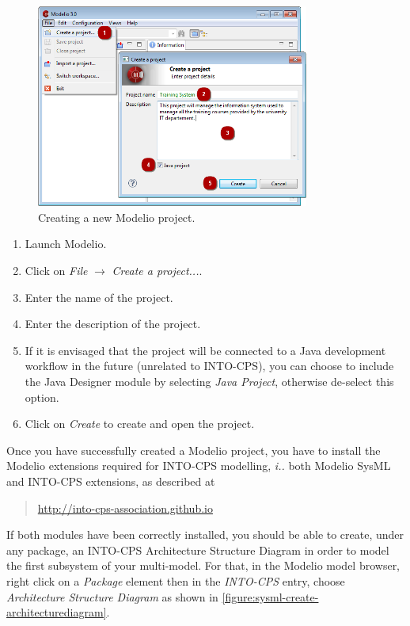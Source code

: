 %
\begin{figure}[hpt!]
\centering
\includegraphics[width=0.8\textwidth]{./figures/modelio-createnewproject.png}
\caption{Creating a new Modelio project.}
\label{figure:modelio-project-creation}
\end{figure}
%
%
%
\begin{enumerate}
\item Launch Modelio.
\item Click on \emph{File} $\rightarrow$ \emph{Create a project...}.
\item Enter the name of the project.
\item Enter the description of the project.
\item If it is envisaged that the project will be connected to a Java development workflow in the future (unrelated to INTO-CPS), you can choose to include the Java Designer module by selecting \emph{Java Project}, otherwise de-select this option.
\item Click on \emph{Create} to create and open the project.
\end{enumerate}
%
%
%
Once you have successfully created a Modelio project, you have to install the Modelio extensions required for INTO-CPS modelling, \emph{i.\@e.\@} both Modelio SysML and INTO-CPS extensions, as described at
%
%
%
\begin{quote}
\url{http://into-cps-association.github.io}
\end{quote}
%
%
%
If both modules have been correctly installed, you should be able to create, under any package, an INTO-CPS Architecture Structure Diagram in order to model the first subsystem of your multi-model.
%
For that, in the Modelio model browser, right click on a \textit{Package} element then in the \textit{INTO-CPS} entry, choose \textit{Architecture Structure Diagram} as shown in \autoref{figure:sysml-create-architecturediagram}.
